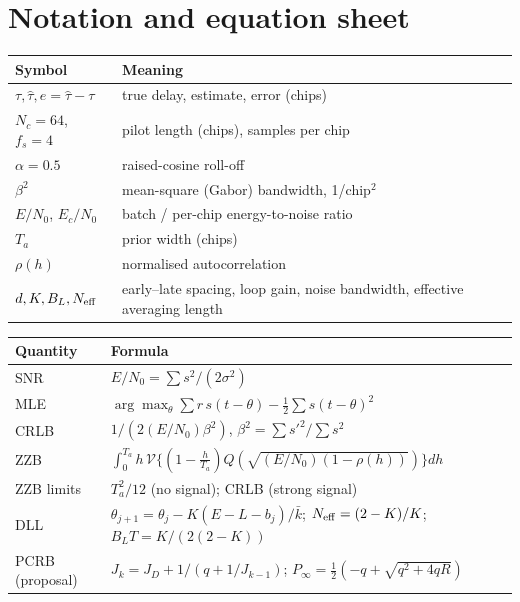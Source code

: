 \documentclass[11pt,a4paper]{article}
\newcommand{\ENo}{E/N_0}
\newcommand{\VF}{\mathcal{V}}
\begin{document}
\section{Notation and equation sheet}
\begin{center}
\begin{tabular}{ll}
\toprule
\textbf{Symbol} & \textbf{Meaning}\\
\midrule
$\tau,\hat\tau,e=\hat\tau-\tau$ & true delay, estimate, error (chips)\\
$N_c=64$, $f_s=4$ & pilot length (chips), samples per chip\\
$\alpha=0.5$ & raised-cosine roll-off\\
$\beta^2$ & mean-square (Gabor) bandwidth, 1/chip$^2$\\
$\ENo$, $E_c/N_0$ & batch / per-chip energy-to-noise ratio\\
$T_a$ & prior width (chips)\\
$\rho(h)$ & normalised autocorrelation\\
$d,K,B_L,N_{\rm eff}$ & early--late spacing, loop gain, noise bandwidth, effective averaging length\\
\bottomrule
\end{tabular}

\medskip
\begin{tabular}{ll}
\toprule
\textbf{Quantity} & \textbf{Formula}\\
\midrule
SNR & $\ENo=\sum s^2/(2\sigma^2)$\\
MLE & $\arg\max_\theta\sum r\,s(t-\theta)-\frac12\sum s(t-\theta)^2$\\
CRLB & $1/(2(\ENo)\beta^2)$, $\beta^2=\sum s'^2/\sum s^2$\\
ZZB & $\int_0^{T_a}h\,\VF\{(1-\frac h{T_a})Q(\sqrt{(\ENo)(1-\rho(h))})\}dh$\\
ZZB limits & $T_a^2/12$ (no signal); CRLB (strong signal)\\
DLL & $\theta_{j+1}=\theta_j-K(E-L-b_j)/\bar k$; $N_{\rm eff}=(2-K)/K$; $B_LT=K/(2(2-K))$\\
PCRB (proposal) & $J_k=J_D+1/(q+1/J_{k-1})$; $P_\infty=\frac12(-q+\sqrt{q^2+4qR})$\\
\bottomrule
\end{tabular}
\end{center}
\end{document}
